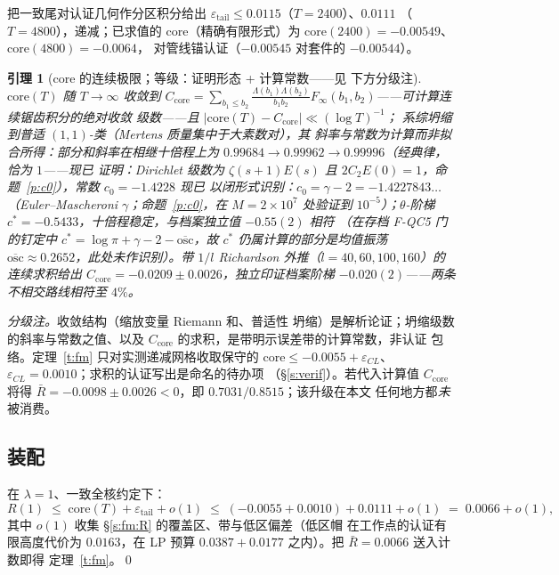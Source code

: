 \documentclass[11pt]{article}
\numberwithin{equation}{section}
\newtheorem{lemma}[theorem]{引理}
\theoremstyle{definition}
\theoremstyle{remark}
\newcommand{\LL}{\Lambda}
\begin{document}
\noindent 把一致尾对认证几何作分区积分给出
$\varepsilon_{\mathrm{tail}}\le0.0115$（$T=2400$）、$0.0111$
（$T=4800$），递减；已求值的 core（精确有限形式）为
$\mathrm{core}(2400)=-0.00549$、$\mathrm{core}(4800)=-0.0064$，
对管线锚认证（$-0.00545$ 对套件的 $-0.00544$）。

\begin{lemma}[core 的连续极限；等级：证明形态 + 计算常数——见
下方分级注]\label{l:CL}
$\mathrm{core}(T)$ 随 $T\to\infty$ 收敛到
$C_{\mathrm{core}}=\sum_{b_1\le b_2}\frac{\LL(b_1)\LL(b_2)}
{b_1b_2}F_\infty(b_1,b_2)$——可计算连续锯齿积分的绝对收敛
级数——且 $|\mathrm{core}(T)-C_{\mathrm{core}}|\ll(\log T)^{-1}$；
系综坍缩到普适 $(1,1)$-类（Mertens 质量集中于大素数对），其
斜率与常数为计算而非拟合所得：部分和斜率在相继十倍程上为
$0.99684\to0.99962\to0.99996$（经典律，恰为 $1$——现已
\emph{证明}：Dirichlet 级数为 $\zeta(s+1)E(s)$ 且
$2C_2E(0)=1$，命题~\ref{p:c0}），常数 $c_0=-1.4228$ 现已
\emph{以闭形式识别}：$c_0=\gamma-2=-1.4227843\ldots$
（Euler--Mascheroni $\gamma$；命题~\ref{p:c0}，在
$M=2\times10^{7}$ 处验证到 $10^{-5}$）；$\theta$-阶梯
$c^{*}=-0.5433$，十倍程稳定，与档案独立值 $-0.55(2)$ 相符
（在存档 F-QC5 门的钉定中
$c^{*}=\log\pi+\gamma-2-\overline{\mathrm{osc}}$，故 $c^{*}$
仍属计算的部分是均值振荡
$\overline{\mathrm{osc}}\approx0.2652$，此处未作识别）。带
$1/l$ Richardson 外推（$l=40,60,100,160$）的连续求积给出
$C_{\mathrm{core}}=-0.0209\pm0.0026$，独立印证档案阶梯
$-0.020(2)$——两条不相交路线相符至 $4\%$。
\end{lemma}

\noindent\emph{分级注。}收敛结构（缩放变量 Riemann 和、普适性
坍缩）是解析论证；坍缩级数的斜率与常数之值、以及
$C_{\mathrm{core}}$ 的求积，是带明示误差带的计算常数，非认证
包络。定理~\ref{t:fm} 只对实测递减网格收取保守的
$\mathrm{core}\le-0.0055+\varepsilon_{CL}$、
$\varepsilon_{CL}=0.0010$；求积的认证写出是命名的待办项
（\S\ref{s:verif}）。若代入计算值 $C_{\mathrm{core}}$ 将得
$\bar R=-0.0098\pm0.0026<0$，即 $0.7031/0.8515$；该升级在本文
任何地方都\emph{未}被消费。

\subsection{装配}\label{s:fm:assembly}

在 $\lambda=1$、一致全核约定下：
\[
R(1)\;\le\;\mathrm{core}(T)+\varepsilon_{\mathrm{tail}}+o(1)
\;\le\;(-0.0055+0.0010)+0.0111+o(1)\;=\;0.0066+o(1),
\]
其中 $o(1)$ 收集 \S\ref{s:fm:R} 的覆盖区、带与低区偏差（低区帽
在工作点的认证有限高度代价为 $0.0163$，在 LP 预算
$0.0387+0.0177$ 之内）。把 $\bar R=0.0066$ 送入计数即得
定理~\ref{t:fm}。\qed
\end{document}
